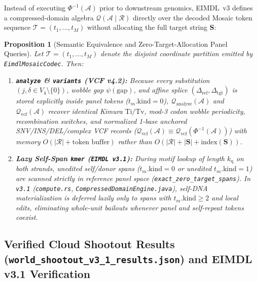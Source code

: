 \documentclass[10pt]{article}
\newtheorem{proposition}{Proposition}
\theoremstyle{definition}
\begin{document}
Instead of executing $\Phi^{-1}(\mathcal{A})$ prior to downstream genomics, EIMDL~v3 defines a compressed-domain algebra $\mathcal{Q}(\mathcal{A} \mid \mathcal{R})$ directly over the decoded Mosaic token sequence $\mathcal{T} = (t_1,\dots,t_M)$ without allocating the full target string $\mathbf{S}$:
\begin{proposition}[Semantic Equivalence and Zero-Target-Allocation Panel Queries]
Let $\mathcal{T} = (t_1,\dots,t_M)$ denote the disjoint coordinate partition emitted by \texttt{EimdlMosaicCodec}. Then:
\begin{enumerate}
  \item \textbf{\texttt{analyze} \& \texttt{variants} (VCF v4.2):} Because every substitution $(j, \delta \in V_4\setminus\{0\})$, wobble gap $\psi(\text{gap})$, and affine splice $(\Delta_{\text{ref}}, \Delta_{\text{tgt}})$ is stored explicitly inside panel tokens ($t_m.\text{kind}=0$), $\mathcal{Q}_{\text{analyze}}(\mathcal{A})$ and $\mathcal{Q}_{\text{vcf}}(\mathcal{A})$ recover identical Kimura $\text{Ti/Tv}$, mod-3 codon wobble periodicity, recombination switches, and normalized 1-base anchored SNV/INS/DEL/complex VCF records ($\mathcal{Q}_{\text{vcf}}(\mathcal{A}) \equiv \mathcal{Q}_{\text{vcf}}(\Phi^{-1}(\mathcal{A}))$) with memory $O(|\mathcal{R}| + \text{token buffer})$ rather than $O(|\mathcal{R}| + |\mathbf{S}| + \text{index}(\mathbf{S}))$.
  \item \textbf{Lazy Self-Span \texttt{kmer} (\texttt{EIMDL~v3.1}):} During motif lookup of length $k_{\text{q}}$ on both strands, unedited self/donor spans ($t_m.\text{kind}=0$ or unedited $t_m.\text{kind}=1$) are scanned strictly in reference panel space (\texttt{exact\_zero\_target\_spans}). In \texttt{v3.1} (\texttt{compute.rs}, \texttt{CompressedDomainEngine.java}), self-DNA materialization is deferred lazily only to spans with $t_m.\text{kind} \ge 2$ and local edits, eliminating whole-unit bailouts whenever panel and self-repeat tokens coexist.
\end{enumerate}
\end{proposition}

\subsection{Verified Cloud Shootout Results (\texttt{world\_shootout\_v3\_1\_results.json}) and EIMDL v3.1 Verification}
\end{document}
